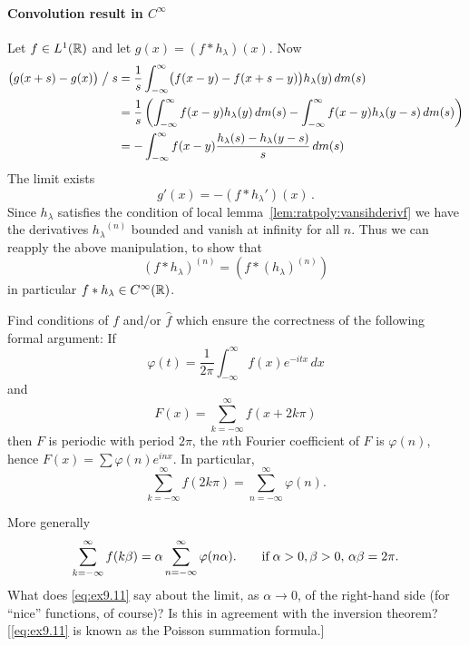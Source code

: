 \begin{enumerate}
\paragraph{Convolution result in \(C^\infty\)}
Let \(f\in L^1(\mathbb{R})\) and let \(g(x) = (f\ast h_\lambda)(x)\). Now
\begin{align*}
\bigl(g(x+s)-g(x)\bigr) \bigm/ s
&= \frac{1}{s} 
   \int_{-\infty}^\infty \bigl(f(x-y) - f(x+s-y)\bigr)h_\lambda(y)\,dm(s) \\
&= \frac{1}{s}\left(
   \int_{-\infty}^\infty f(x-y) h_\lambda(y)\,dm(s) -
   \int_{-\infty}^\infty f(x-y)h_\lambda(y-s)\,dm(s)
   \right) \\
&= -\int_{-\infty}^\infty f(x-y)\frac{h_\lambda(s) - h_\lambda(y-s)}{s}\,dm(s)
\end{align*}
The limit exists
\begin{equation*}
g'(x) = -(f \ast {h_\lambda}')(x)\,.
\end{equation*}
Since \(h_\lambda\) satisfies the condition 
of local lemma~\ref{lem:ratpoly:vansihderivf} we have
the derivatives \({h_\lambda}^{(n)}\) bounded and vanish at infinity
for all $n$. Thus we can reapply the above manipulation, to show that 
\begin{equation*}
(f\ast h_\lambda)^{(n)} = (f\ast (h_\lambda)^{(n)})
\end{equation*}
in particular \(f\ast h_\lambda \in C^\infty(\mathbb{R})\).

\begin{excopy}
Find conditions of $f$ and/or \(\widehat{f}\) which ensure the correctness of 
the following formal argument: If
\begin{equation*}
 \varphi(t) = \frac{1}{2\pi} \int_{-\infty}^\infty f(x)e^{-itx}\,dx
\end{equation*}
and
\begin{equation*}
 F(x) = \sum_{k = -\infty}^\infty f(x + 2k\pi)
\end{equation*}
then $F$ is periodic with period \(2\pi\), the $n$th Fourier coefficient of $F$
is \(\varphi(n)\), hence
\(F(x) = \sum \varphi(n)e^{inx}\). In particular,
\begin{equation*}
\sum_{k = -\infty}^\infty f(2k\pi) = \sum_{n = -\infty}^\infty \varphi(n).
\end{equation*}

More generally
\begin{equation} \label{eq:ex9.11}
\sum_{k = -\infty}^\infty f(k\beta) 
= \alpha \sum_{n = -\infty}^\infty \varphi(n\alpha).
\qquad \textnormal{if}\; \alpha>0, \beta>0,\, \alpha\beta = 2\pi.
\end{equation}
What does \eqref{eq:ex9.11} say about the limit, as \(\alpha\to 0\),
of the right-hand side 
(for ``nice'' functions, of course)?
Is this in agreement with the inversion theorem?
\\
[\eqref{eq:ex9.11} is known as the Poisson summation formula.]
\end{excopy}


\end{enumerate}
